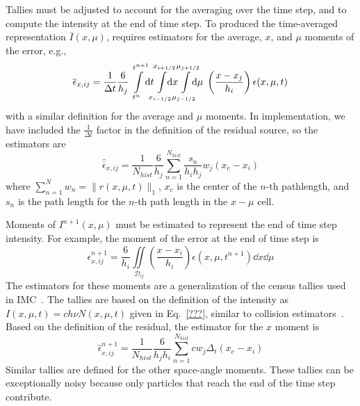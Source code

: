 Tallies must be adjusted to account for the averaging over the time step, and to compute the
intensity at the end of time step.  To produced the time-averaged representation
$\overline I(x,\mu)$, requires estimators for the average, $x$, and $\mu$ moments of the
error, e.g.,
\begin{equation}
    \overline\epsilon_{x,ij} = \frac{1}{\Delta t} \frac{6}{h_j}
    \int\limits_{t^{n}}^{t^{n+1}} \!\!\dd t \!\!\!
    \int\limits_{\xl}^{\xr} \!\!\!\!\! \dd x
    \hspace{-0.081in}\int\limits_{\mu_{j-1/2}}^{\mu_{j+1/2}} \hspace{-0.107in} \dd \mu
    \;\left(\frac{x - x_j}{h_{i}}\right) \epsilon(x,\mu,t)
\end{equation}
with a similar definition for the average and $\mu$ moments.  In implementation, we have
included the $\frac{1}{\Delta t}$ factor in the definition of the residual source, so
the estimators are
\begin{equation}
    \hat{\overline \epsilon}_{x,ij} =\frac{1}{N_{hist}} \frac{6}{h_j} \sum_{n=1}^{N_{hist}}
    \frac{s_n}{h_{i}h_{j}} w_j \left(x_c - x_i\right)
\end{equation}
where $\sum\limits_{n=1}^{N} w_n = \| r(x,\mu,t) \|_1$, $x_c$ is the center of the $n$-th
pathlength, and $s_{n}$ is the path length for the $n$-th path length in the $x-\mu$ cell.

Moments of $I^{n+1}(x,\mu)$ must be estimated to represent the end of time step intensity.
For example, the moment of the error at the end of time step is
\begin{equation}
    \epsilon^{n+1}_{x,ij} = \frac{6}{h_i} \iint\limits_{\mathcal{D}_{ij}} \left(\frac{x
    - x_i}{h_i}\right) \epsilon(x,\mu,t^{n+1}) \dd x \dd \mu
\end{equation}
The estimators for these moments are a generalization of the census
tallies used in IMC~\cite{wollaber_review,wollaber_thesis}.  The tallies are based on the
definition of the intensity as $I(x,\mu,t) = c h \nu N(x,\mu,t)$ given in
Eq.~\eqref{???}, similar to collision estimators~\cite{shultis_mc,mcnp}.  Based on the 
definition of the residual, the estimator for the $x$ moment is
\begin{equation}
    \hat\epsilon^{n+1}_{x,ij} = \frac{1}{N_{hist}} \frac{6}{h_j h_i} \sum_{n=1}^{N_{hist}}
    c w_j \Delta_t \left(x_{c} - x_{i}\right)
\end{equation}
Similar tallies are defined for the other space-angle moments. These tallies can be
exceptionally noisy because only particles that reach the end of the time step contribute.

